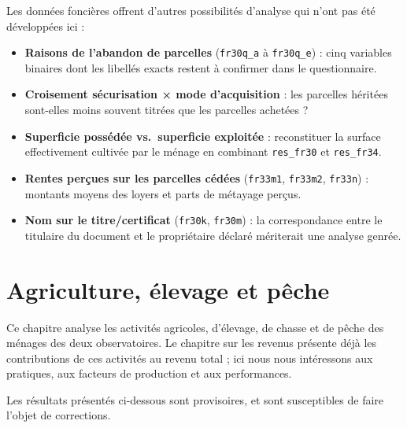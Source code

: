 \documentclass[
  french,
  letterpaper,
]{report}
\providecommand{\tightlist}{%
  \setlength{\itemsep}{0pt}\setlength{\parskip}{0pt}}
\begin{document}
Les données foncières offrent d'autres possibilités d'analyse qui n'ont
pas été développées ici :

\begin{itemize}
\tightlist
\item
  \textbf{Raisons de l'abandon de parcelles} (\texttt{fr30q\_a} à
  \texttt{fr30q\_e}) : cinq variables binaires dont les libellés exacts
  restent à confirmer dans le questionnaire.
\item
  \textbf{Croisement sécurisation × mode d'acquisition} : les parcelles
  héritées sont-elles moins souvent titrées que les parcelles achetées ?
\item
  \textbf{Superficie possédée vs.~superficie exploitée} : reconstituer
  la surface effectivement cultivée par le ménage en combinant
  \texttt{res\_fr30} et \texttt{res\_fr34}.
\item
  \textbf{Rentes perçues sur les parcelles cédées} (\texttt{fr33m1},
  \texttt{fr33m2}, \texttt{fr33n}) : montants moyens des loyers et parts
  de métayage perçus.
\item
  \textbf{Nom sur le titre/certificat} (\texttt{fr30k}, \texttt{fr30m})
  : la correspondance entre le titulaire du document et le propriétaire
  déclaré mériterait une analyse genrée.
\end{itemize}


\chapter{Agriculture, élevage et
pêche}\label{agriculture-uxe9levage-et-puxeache}

Ce chapitre analyse les activités agricoles, d'élevage, de chasse et de
pêche des ménages des deux observatoires. Le chapitre sur les revenus
présente déjà les contributions de ces activités au revenu total ; ici
nous nous intéressons aux pratiques, aux facteurs de production et aux
performances.

\begin{tcolorbox}[enhanced jigsaw, colframe=quarto-callout-warning-color-frame, colback=white, titlerule=0mm, colbacktitle=quarto-callout-warning-color!10!white, toptitle=1mm, opacitybacktitle=0.6, title=\textcolor{quarto-callout-warning-color}{\faExclamationTriangle}\hspace{0.5em}{Travail de vérification en cours}, left=2mm, leftrule=.75mm, bottomtitle=1mm, coltitle=black, arc=.35mm, rightrule=.15mm, bottomrule=.15mm, toprule=.15mm, opacityback=0, breakable]

Les résultats présentés ci-dessous sont provisoires, et sont
susceptibles de faire l'objet de corrections.

\end{tcolorbox}
\end{document}
